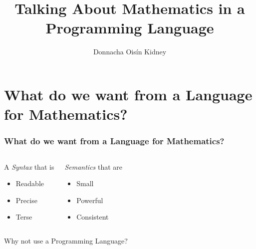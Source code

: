 \documentclass[usenames,dvipsnames]{beamer}
\title{Talking About Mathematics in a Programming Language}
\author{Donnacha Oisín Kidney}
\begin{document}
\maketitle
\tableofcontents

\section{What do we want from a Language for Mathematics?}
\begin{frame}
  \frametitle{What do we want from a Language for Mathematics?}
  \pause
  \begin{columns}[T]
    \begin{block}{A \emph{Syntax} that is}
      \begin{itemize}
        \item Readable
        \item Precise
        \item Terse
      \end{itemize}
    \end{block}
    \pause
    \begin{block}{\emph{Semantics} that are}
      \begin{itemize}
        \item Small
        \item Powerful
        \item Consistent
      \end{itemize}
    \end{block}
  \end{columns}
\end{frame}
\begin{frame}[standout]
  Why not use a Programming Language?
\end{frame}
\end{document}
